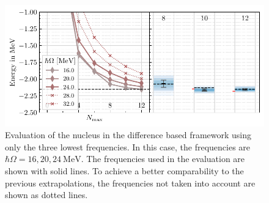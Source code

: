\begin{figure}[H]
  \centering
  \includegraphics{media/outlook_selection.pdf}
  \caption{Evaluation of the  nucleus in the difference based framework using only the three lowest frequencies. In this case, the frequencies are $\hbar\Omega = 16, 20, \SI{24}{\mega\electronvolt}$. The frequencies used in the evaluation are shown with solid lines. To achieve a better comparability to the previous extrapolations, the frequencies not taken into account are shown as dotted lines.}
  \label{fig:eval_freqselection}
\end{figure}
